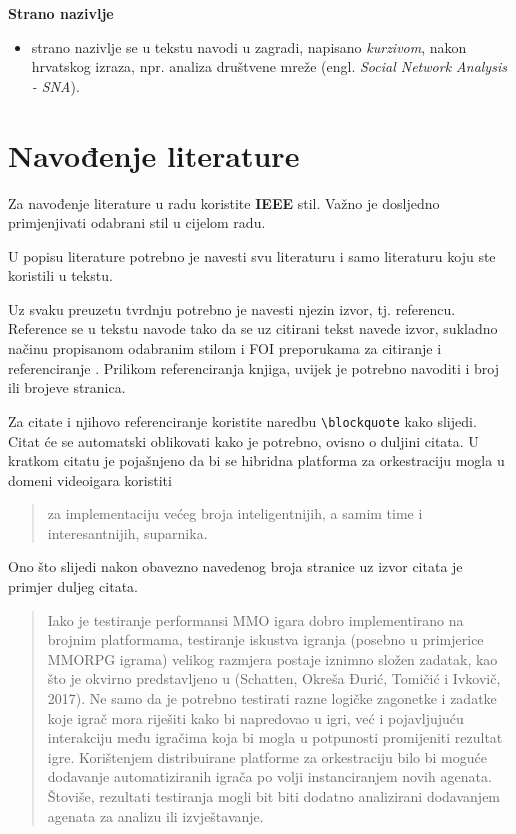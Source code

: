 \documentclass[]{foi} %
\begin{document}
\textbf{Strano nazivlje}
\begin{itemize}
	\item strano nazivlje se u tekstu navodi u zagradi, napisano \textit{kurzivom}, nakon hrvatskog izraza, npr. analiza društvene mreže (engl. \textit{Social Network Analysis - SNA}).
\end{itemize}



\section{Navođenje literature}

Za navođenje literature u radu koristite \textbf{IEEE} stil. Važno je dosljedno primjenjivati odabrani stil u cijelom radu.

U popisu literature potrebno je navesti svu literaturu i samo literaturu koju ste koristili u tekstu.

Uz svaku preuzetu tvrdnju potrebno je navesti njezin izvor, tj. referencu. Reference se u tekstu navode tako da se uz citirani tekst navede izvor, sukladno načinu propisanom odabranim stilom i FOI preporukama za citiranje i referenciranje \cite{sveucilisteuzagrebufakultetorganizacijeiinformatike2017FOIPreporukeCitiranja}. Prilikom referenciranja knjiga, uvijek je potrebno navoditi i broj ili brojeve stranica.

Za citate i njihovo referenciranje koristite naredbu \lstinline+\blockquote+ kako slijedi. Citat će se automatski oblikovati kako je potrebno, ovisno o duljini citata. U kratkom citatu je pojašnjeno da bi se hibridna platforma za orkestraciju mogla u domeni videoigara koristiti
\blockquote[{\cite[str. 5]{schatten2020PlatformeZaOrkestraciju}}]{za implementaciju većeg broja inteligentnijih, a samim
	time i interesantnijih, suparnika.} Ono što slijedi nakon obavezno navedenog broja stranice uz izvor citata je primjer duljeg citata.

\blockquote[{\cite[str. 6]{schatten2020PlatformeZaOrkestraciju}}]{Iako je testiranje performansi MMO igara dobro implementirano na brojnim platformama, testiranje iskustva
	igranja (posebno u primjerice MMORPG igrama) velikog razmjera postaje iznimno složen zadatak, kao što
	je okvirno predstavljeno u (Schatten, Okreša Ðurić, Tomičić i Ivkovič, 2017). Ne samo da je potrebno testirati
	razne logičke zagonetke i zadatke koje igrač mora riješiti kako bi napredovao u igri, već i pojavljujuću interakciju među igračima koja bi mogla u potpunosti promijeniti rezultat igre. Korištenjem distribuirane platforme za orkestraciju bilo bi moguće dodavanje automatiziranih igrača po volji instanciranjem novih agenata. Štoviše, rezultati testiranja mogli bit biti dodatno
	analizirani dodavanjem agenata za analizu ili izvještavanje.}
\end{document}
